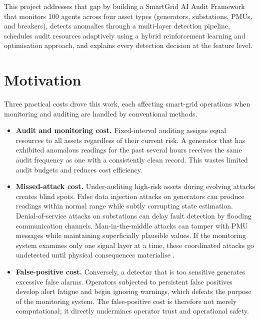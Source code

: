 This project addresses that gap by building a SmartGrid AI Audit Framework that monitors 100 agents across four asset types (generators, substations, PMUs, and breakers), detects anomalies through a multi-layer detection pipeline, schedules audit resources adaptively using a hybrid reinforcement learning and optimisation approach, and explains every detection decision at the feature level.


\section{Motivation}

Three practical costs drove this work, each affecting smart-grid operations when monitoring and auditing are handled by conventional methods.

\begin{itemize}
    \item \textbf{Audit and monitoring cost.} Fixed-interval auditing assigns equal resources to all assets regardless of their current risk. A generator that has exhibited anomalous readings for the past several hours receives the same audit frequency as one with a consistently clean record. This wastes limited audit budgets and reduces cost efficiency.

    \item \textbf{Missed-attack cost.} Under-auditing high-risk assets during evolving attacks creates blind spots. False data injection attacks on generators can produce readings within normal range while subtly corrupting state estimation. Denial-of-service attacks on substations can delay fault detection by flooding communication channels. Man-in-the-middle attacks can tamper with PMU messages while maintaining superficially plausible values. If the monitoring system examines only one signal layer at a time, these coordinated attacks go undetected until physical consequences materialise \cite{liu2009false, hu2023detection, korba2020anomaly}.

    \item \textbf{False-positive cost.} Conversely, a detector that is too sensitive generates excessive false alarms. Operators subjected to persistent false positives develop alert fatigue and begin ignoring warnings, which defeats the purpose of the monitoring system. The false-positive cost is therefore not merely computational; it directly undermines operator trust and operational safety.
\end{itemize}

